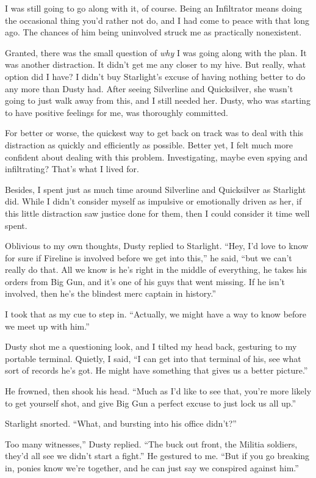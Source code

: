I was still going to go along with it, of course. Being an Infiltrator means doing the occasional thing you’d rather not do, and I had come to peace with that long ago. The chances of him being uninvolved struck me as practically nonexistent.

Granted, there was the small question of \textit{why} I was going along with the plan. It was another distraction. It didn’t get me any closer to my hive. But really, what option did I have? I didn’t buy Starlight’s excuse of having nothing better to do any more than Dusty had. After seeing Silverline and Quicksilver, she wasn’t going to just walk away from this, and I still needed her. Dusty, who was starting to have positive feelings for me, was thoroughly committed.

For better or worse, the quickest way to get back on track was to deal with this distraction as quickly and efficiently as possible. Better yet, I felt much more confident about dealing with this problem. Investigating, maybe even spying and infiltrating? That’s what I lived for.

Besides, I spent just as much time around Silverline and Quicksilver as Starlight did. While I didn’t consider myself as impulsive or emotionally driven as her, if this little distraction saw justice done for them, then I could consider it time well spent.

Oblivious to my own thoughts, Dusty replied to Starlight. “Hey, I’d love to know for sure if Fireline is involved before we get into this,” he said, “but we can’t really do that. All we know is he’s right in the middle of everything, he takes his orders from Big Gun, and it’s one of his guys that went missing. If he isn’t involved, then he’s the blindest merc captain in history.”

I took that as my cue to step in. “Actually, we might have a way to know before we meet up with him.”

Dusty shot me a questioning look, and I tilted my head back, gesturing to my portable terminal. Quietly, I said, “I can get into that terminal of his, see what sort of records he’s got. He might have something that gives us a better picture.”

He frowned, then shook his head. “Much as I’d like to see that, you’re more likely to get yourself shot, and give Big Gun a perfect excuse to just lock us all up.”

Starlight snorted. “What, and bursting into his office didn’t?”

\leavevmode{}Too many witnesses,” Dusty replied. “The buck out front, the Militia soldiers, they’d all see we didn’t start a fight.” He gestured to me. “But if you go breaking in, ponies know we’re together, and he can just say we conspired against him.”

